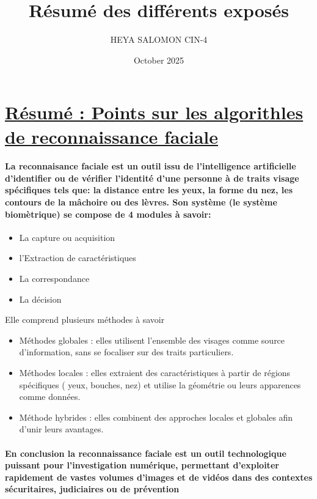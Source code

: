 \documentclass{article}
\title{\textbf{Résumé des différents exposés}}
\author{HEYA SALOMON CIN-4 }
\date{October 2025}
\begin{document}
\maketitle

\section{\underline{Résumé : Points sur les algorithles de reconnaissance faciale}}
\paragraph{La reconnaisance faciale est un outil issu de l'intelligence artificielle d'identifier ou de vérifier l'identité d'une personne à de traits visage spécifiques tels que: la distance entre les yeux, la forme du nez, les contours de la mâchoire ou des lèvres.
Son système (le système biomètrique) se compose de 4 modules à savoir:} 
\begin{itemize}
\item La capture ou acquisition
\item l'Extraction de caractéristiques
\item La correspondance
\item La décision
\end{itemize}

Elle comprend plusieurs méthodes à savoir
\begin{itemize}
\item Méthodes globales : elles utilisent l'ensemble des visages comme source d'information, sans se focaliser sur des traits particuliers.
\item Méthodes locales : elles extraient des caractéristiques à partir de régions spécifiques ( yeux, bouches, nez) et utilise la géométrie ou leurs apparences comme données. 
\item Méthode hybrides : elles combinent des approches locales et globales afin d'unir leurs avantages.
\end{itemize}

\paragraph{En conclusion la reconnaissance faciale est un outil technologique puissant pour l'investigation numérique, permettant d'exploiter rapidement de vastes volumes d'images et de vidéos dans des contextes sécuritaires, judiciaires ou de prévention}
\end{document}
